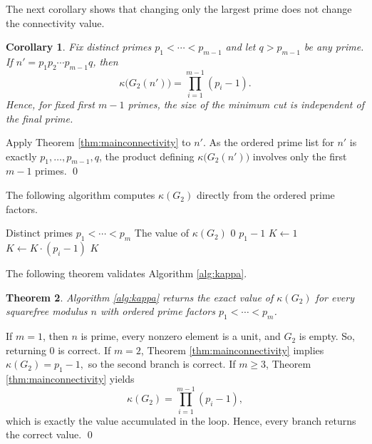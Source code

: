 \documentclass[12pt]{article}
\renewenvironment{proof}{{\bf \noindent Proof.}}{\qed}
\newtheorem{theorem}{Theorem}[section]
\newtheorem{corollary}[theorem]{Corollary}
\theoremstyle{definition}
\begin{document}
	
	\medskip
	The next corollary shows that changing only the largest prime does not change the connectivity value.	
	\begin{corollary}\label{cor:largestinvariance}
		Fix distinct primes $p_1<\cdots<p_{m-1}$ and let $q>p_{m-1}$ be any prime. If $n'=p_1p_2\cdots p_{m-1}q$, then
		$$
		\kappa\big(G_2(n')\big)=\prod_{i=1}^{m-1}(p_i-1).
		$$
		Hence, for fixed first $m-1$ primes, the size of the minimum cut is independent of the final prime.
	\end{corollary}
	
	\begin{proof}
		Apply Theorem \ref{thm:mainconnectivity} to $n'$. As the ordered prime list for $n'$ is exactly $p_1,\dots,p_{m-1},q$, the product defining $\kappa\big(G_2(n')\big)$ involves only the first $m-1$ primes.
	\end{proof}
	
	\medskip
	 The following algorithm computes $\kappa(G_2)$ directly from the ordered prime factors.	
	\begin{algorithm}[H]
		\caption{Computation of $\kappa(G_2)$ for squarefree $n=p_1p_2\cdots p_m$}
		\label{alg:kappa}
		\begin{algorithmic}[1]
			\Require Distinct primes $p_1<\cdots<p_m$
			\Ensure The value of $\kappa(G_2)$
			\State \Return $0$
			\State \Return $p_1-1$
			\Else
			\State $K\gets 1$
			\State $K\gets K\cdot (p_i-1)$
			\EndFor
			\State \Return $K$
			\EndIf
		\end{algorithmic}
	\end{algorithm}
	
	\medskip
	The following theorem validates Algorithm \ref{alg:kappa}.	
	\begin{theorem}\label{thm:algorithmcorrect}
		Algorithm \ref{alg:kappa} returns the exact value of $\kappa(G_2)$ for every squarefree modulus $n$ with ordered prime factors $p_1<\cdots<p_m$.
	\end{theorem}
	
	\begin{proof}
		If $m=1$, then $n$ is prime, every nonzero element is a unit, and $G_2$ is empty. So, returning $0$ is correct. If $m=2$, Theorem \ref{thm:mainconnectivity} implies
		$ \kappa(G_2)=p_1-1, $ so the second branch is correct. If $m\geq 3$, Theorem \ref{thm:mainconnectivity} yields
		$$
		\kappa(G_2)=\prod_{i=1}^{m-1}(p_i-1),
		$$
		which is exactly the value accumulated in the loop. Hence, every branch returns the correct value.
	\end{proof}
	
\end{document}
